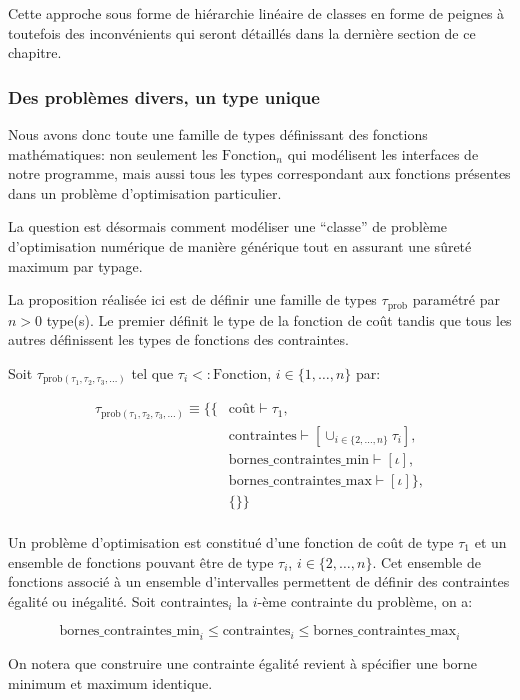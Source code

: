 Cette approche sous forme de hiérarchie linéaire de classes en forme
de peignes à toutefois des inconvénients qui seront détaillés dans la
dernière section de ce chapitre.


\subsubsection{Des problèmes divers, un type unique}


Nous avons donc toute une famille de types définissant des fonctions
mathématiques: non seulement les $\text{Fonction}_n$ qui modélisent
les interfaces de notre programme, mais aussi tous les types
correspondant aux fonctions présentes dans un problème d'optimisation
particulier.

La question est désormais comment modéliser une ``classe'' de problème
d'optimisation numérique de manière générique tout en assurant une
sûreté maximum par typage.

La proposition réalisée ici est de définir une famille de types
$\tau_{\text{prob}}$ paramétré par $n > 0$ type(s). Le premier définit
le type de la fonction de coût tandis que tous les autres définissent
les types de fonctions des contraintes.


\begin{mydef}\label{def:chap1_prob}
  Soit $\tau_{\text{prob}(\tau_1, \tau_2, \tau_3, \dotsc)}$ tel que
  $\tau_i <: \text{Fonction}$, $i \in \{1, \dotsc, n\}$ par:

  \begin{equation}
  \begin{split}
    \tau_{\text{prob}(\tau_1, \tau_2, \tau_3, \dotsc)} \equiv
    \{ \{ & \text{coût} \vdash \tau_1,\\
    & \text{contraintes} \vdash [\cup_{i \in \{2, \dotsc, n\}} \tau_i],\\
    & \text{bornes\_contraintes\_min} \vdash [\iota], \\
    & \text{bornes\_contraintes\_max} \vdash [\iota] \},\\
    & \{ \} \}\\
  \end{split}
  \end{equation}

  Un problème d'optimisation est constitué d'une fonction de coût de
  type $\tau_1$ et un ensemble de fonctions pouvant être de type
  $\tau_i$, $i \in \{2, \dotsc, n\}$. Cet ensemble de fonctions
  associé à un ensemble d'intervalles permettent de définir des
  contraintes égalité ou inégalité. Soit $\text{contraintes}_i$ la
  $i$-ème contrainte du problème, on a:

  \begin{equation}
    \text{bornes\_contraintes\_min}_i \leq \text{contraintes}_i \leq
    \text{bornes\_contraintes\_max}_i
  \end{equation}

  On notera que construire une contrainte égalité revient à spécifier
  une borne minimum et maximum identique.
\end{mydef}


